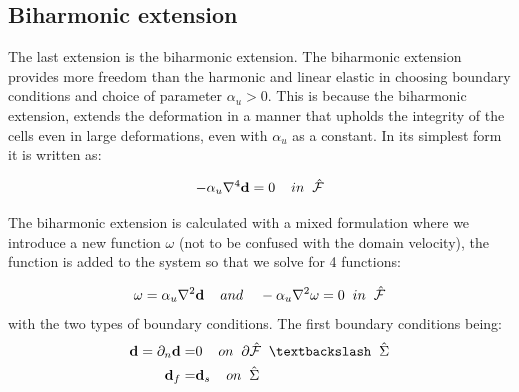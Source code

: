 \subsection{Biharmonic extension} 
The last extension is the biharmonic extension. The biharmonic extension provides more freedom than the harmonic and linear elastic in choosing boundary conditions and choice of parameter $\alpha_u > 0$. This is because the biharmonic extension, extends the deformation in a manner that upholds the integrity of the cells even in large deformations, even with $\alpha_u$ as a constant. In its simplest form it is written as:

\begin{equation}
- \alpha_u \nabla^4 \bold{d} = 0 \hspace{4mm}  in \hspace{2mm} \hat{\mathcal{F}}\\
\end{equation}

The biharmonic extension is calculated with a mixed formulation where we introduce a new function $\omega$ (not to be confused with the domain velocity), the function is added to the system so that we solve for 4 functions:

\begin{equation}
\omega = \alpha_u \nabla^2 \bold{d} \hspace{4mm} and \hspace{4mm} - \alpha_u \nabla^2 \omega = 0 \hspace{2mm}   in \hspace{2mm} \hat{\mathcal{F}}
\end{equation}
with the two types of boundary conditions. The first boundary conditions being:
\begin{align}
\bold{d} = \partial_n \bold{d} =& 0 \hspace{4mm} on \hspace{2mm} \partial \hat{\mathcal{F}} \hspace{2mm} \textbackslash \hspace{2mm} \hat{\Sigma}\\
\bold{d}_f =& \bold{d}_s \hspace{4mm } on \hspace{2mm } \hat{\Sigma} 
\end{align}

